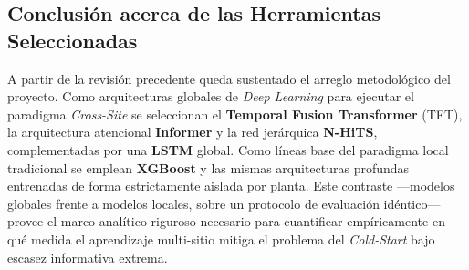 \subsection{Conclusión acerca de las Herramientas Seleccionadas}
A partir de la revisión precedente queda sustentado el arreglo metodológico del proyecto. Como arquitecturas globales de \textit{Deep Learning} para ejecutar el paradigma \textit{Cross-Site} se seleccionan el \textbf{Temporal Fusion Transformer} (TFT), la arquitectura atencional \textbf{Informer} y la red jerárquica \textbf{N-HiTS}, complementadas por una \textbf{LSTM} global. Como líneas base del paradigma local tradicional se emplean \textbf{XGBoost} y las mismas arquitecturas profundas entrenadas de forma estrictamente aislada por planta. Este contraste —modelos globales frente a modelos locales, sobre un protocolo de evaluación idéntico— provee el marco analítico riguroso necesario para cuantificar empíricamente en qué medida el aprendizaje multi-sitio mitiga el problema del \textit{Cold-Start} bajo escasez informativa extrema.

